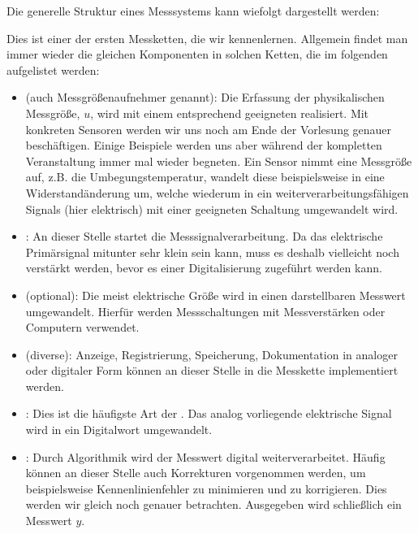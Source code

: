 \documentclass[letterpaper,10pt,english]{jupyterBook}
\begin{document}
\sphinxAtStartPar
Die generelle Struktur eines Messsystems kann wiefolgt dargestellt werden:

\sphinxAtStartPar
{}

\sphinxAtStartPar
Dies ist einer der ersten Messketten, die wir kennenlernen. Allgemein findet man immer wieder die gleichen Komponenten in solchen Ketten, die im folgenden aufgelistet werden:
\begin{itemize}
\item {} 
\sphinxAtStartPar
{} (auch Messgrößenaufnehmer genannt): Die Erfassung der physikalischen Messgröße, \(u\), wird mit einem entsprechend geeigneten  realisiert. Mit konkreten Sensoren werden wir uns noch am Ende der Vorlesung genauer beschäftigen. Einige Beispiele werden uns aber während der kompletten Veranstaltung immer mal wieder begneten. Ein Sensor nimmt eine Messgröße auf, z.B. die Umbegungstemperatur, wandelt diese beispielsweise in eine Widerstandänderung um, welche wiederum in ein weiterverarbeitungsfähigen Signals (hier elektrisch) mit einer geeigneten Schaltung umgewandelt wird.

\item {} 
\sphinxAtStartPar
{}: An dieser Stelle startet die Messsignalverarbeitung. Da das elektrische Primärsignal mitunter sehr  klein sein kann, muss es deshalb vielleicht noch verstärkt werden, bevor es einer Digitalisierung zugeführt werden kann.

\item {} 
\sphinxAtStartPar
{} (optional): Die meist elektrische Größe wird in einen darstellbaren Messwert umgewandelt. Hierfür werden Messschaltungen mit Messverstärken oder Computern verwendet.

\item {} 
\sphinxAtStartPar
{} (diverse): Anzeige, Registrierung, Speicherung, Dokumentation in analoger oder digitaler Form können an dieser Stelle in die Messkette implementiert werden.

\item {} 
\sphinxAtStartPar
{}: Dies ist die häufigste Art der . Das analog vorliegende elektrische Signal wird in ein Digitalwort umgewandelt.

\item {} 
\sphinxAtStartPar
{}: Durch Algorithmik wird der Messwert digital weiterverarbeitet. Häufig können an dieser Stelle auch Korrekturen vorgenommen werden, um beispielsweise Kennenlinienfehler zu minimieren und zu korrigieren. Dies werden wir gleich noch genauer betrachten. Ausgegeben wird schließlich ein Messwert \(y\).

\end{itemize}
\end{document}
